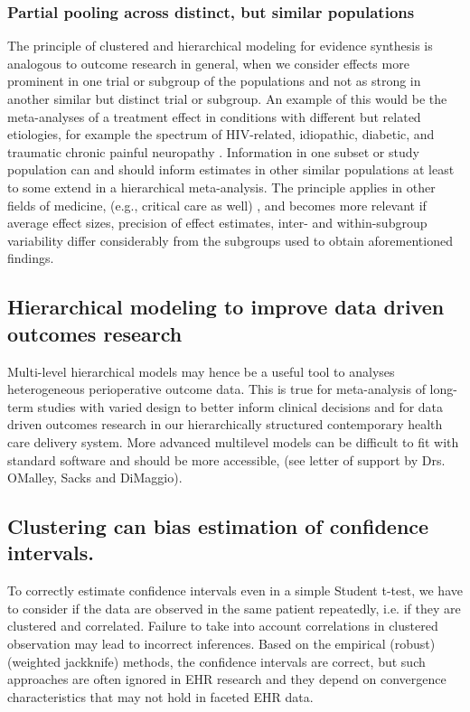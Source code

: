 \documentclass[11pt,notitlepage]{article}
\begin{document}
\subsubsection*{Partial pooling across distinct, but similar populations}
The principle  of clustered and hierarchical modeling for evidence synthesis is analogous to outcome research in general, when we consider effects more prominent in one trial or subgroup of the populations and not as strong in another similar but distinct trial or subgroup. An example of this would be the meta-analyses of a treatment effect in conditions with different but related etiologies, for example the spectrum of HIV-related, idiopathic, diabetic, and traumatic chronic painful neuropathy \cite{Andreae2015}. Information in one subset or study population can and should inform estimates in other similar populations at least to some extend in a hierarchical meta-analysis. The principle applies in other fields of medicine, (e.g., critical care as well) \cite{Roth2015CriticalCare}, and becomes more relevant if average effect sizes, precision of effect estimates, inter- and within-subgroup variability differ considerably from the subgroups used to obtain aforementioned findings.

\subsection*{Hierarchical modeling to improve data driven outcomes research}
 
Multi-level hierarchical models may hence be a useful tool to analyses 
heterogeneous perioperative outcome data. This is true for meta-analysis 
of long-term studies with varied design to better inform clinical 
decisions\cite{AndreaeJohnsonAbstract2013,Spiegelhalter2004bayesian} and 
for data driven outcomes research  in our hierarchically structured 
contemporary health care delivery system. More advanced multilevel 
models can be difficult to fit with standard software and should be 
more accessible, (see letter of support by Drs. OMalley, Sacks and DiMaggio).

\subsection*{Clustering can bias estimation of confidence intervals.} To 
correctly estimate confidence intervals even in a simple Student t-test, 
we have to consider if the data are observed in the same patient 
repeatedly, i.e. if they are clustered and correlated. Failure to take into 
account correlations in clustered observation may lead to incorrect inferences. 
Based on the empirical (robust) (weighted jackknife) methods, the confidence 
intervals are correct, but such approaches are often ignored in EHR research 
and they depend on convergence characteristics that may not hold in faceted EHR data. 
\end{document}
